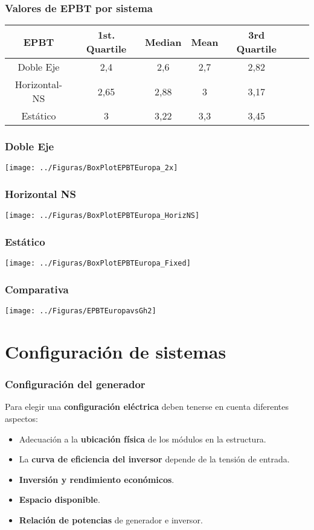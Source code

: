 \documentclass[xcolor=dvipsnames]{beamer}
\begin{document}
\begin{frame}
  \frametitle{Valores de EPBT por sistema}
  \begin{tabular}{ccccccc}
    \toprule
    EPBT & 1st. Quartile & Median & Mean & 3rd Quartile \tabularnewline
    \midrule 
    Doble Eje & 2,4 & 2,6 & 2,7 & 2,82\tabularnewline
    Horizontal-NS &  2,65 & 2,88 & 3 & 3,17\tabularnewline
    Estático & 3 & 3,22 & 3,3 & 3,45\tabularnewline
    \bottomrule 
  \end{tabular}

\end{frame}

\begin{frame}
  \frametitle{Doble Eje}
  \texttt{[image: ../Figuras/BoxPlotEPBTEuropa\_2x]}
\end{frame}

\begin{frame}
  \frametitle{Horizontal NS}
  \texttt{[image: ../Figuras/BoxPlotEPBTEuropa\_HorizNS]}
\end{frame}

\begin{frame}
  \frametitle{Estático}
  \texttt{[image: ../Figuras/BoxPlotEPBTEuropa\_Fixed]}
\end{frame}

\begin{frame}
  \frametitle{Comparativa}
  \texttt{[image: ../Figuras/EPBTEuropavsGh2]}
\end{frame}

\section{Configuración de sistemas}


\begin{frame}
\frametitle{Configuración del generador}

Para elegir una \textbf{configuración eléctrica} deben tenerse en
cuenta diferentes aspectos:
\begin{itemize}
\item Adecuación a la \textbf{ubicación física} de los módulos en la estructura.
\item La \textbf{curva de eficiencia del inversor} depende de la tensión
de entrada.
\item \textbf{Inversión y rendimiento económicos}.
\item \textbf{Espacio disponible}.
\item \textbf{Relación de potencias} de generador e inversor.
\end{itemize}

\end{frame}
\end{document}
